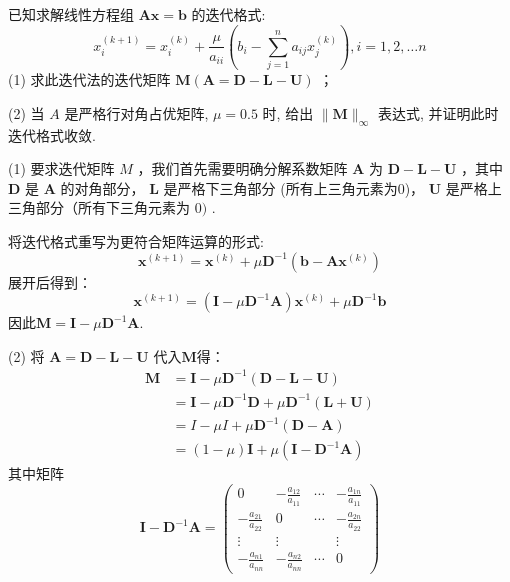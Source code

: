 \begin{tcolorbox}[breakable,
		colframe=white!10!jingga, coltitle=white!90!jingga, colback=white!95!jingga, coltext=black, colbacktitle=white!10!jingga, enhanced, fonttitle=\bfseries,fontupper=\normalsize, attach boxed title to top left={yshift=-2mm}, before skip=8pt, after skip=8pt,
		title=解答题]
 

    已知求解线性方程组 $ \boldsymbol{A x}=\boldsymbol{b} $ 的迭代格式:
$$
x_{i}^{(k+1)}=x_{i}^{(k)}+\frac{\mu}{a_{i i}}\left(b_{i}-\sum_{j=1}^{n} a_{i j} x_{j}^{(k)}\right), i=1,2, \ldots n
$$
(1) 求此迭代法的迭代矩阵 $ \boldsymbol{M}(\boldsymbol{A}=\boldsymbol{D}-\boldsymbol{L}-\boldsymbol{U}) $ ；

(2) 当 $ A $ 是严格行对角占优矩阵, $ {\mu}={0 . 5} $ 时, 给出 $ \|\boldsymbol{M}\|_{\infty} $ 表达式, 并证明此时迭代格式收敛.

\tcblower

(1) 要求迭代矩阵 $ M $ ，我们首先需要明确分解系数矩阵 $ \boldsymbol{A} $ 为 $ \boldsymbol{D}-\boldsymbol{L}-\boldsymbol{U} $ ，其中 $ \boldsymbol{D} $ 是 $ \boldsymbol{A} $ 的对角部分， $ \boldsymbol{L} $ 是严格下三角部分 (所有上三角元素为0)， $ \boldsymbol{U} $ 是严格上三角部分（所有下三角元素为 $ 0) $ .

将迭代格式重写为更符合矩阵运算的形式:
$$
\boldsymbol{x}^{(k+1)}=\boldsymbol{x}^{(k)}+\mu \boldsymbol{D}^{-1}\left(\boldsymbol{b}-\boldsymbol{A} \boldsymbol{x}^{(k)}\right)
$$
展开后得到：
$$
\boldsymbol{x}^{(k+1)}=(\boldsymbol{I}-\mu \boldsymbol{D}^{-1}\boldsymbol{A})\boldsymbol{x}^{(k)}+\mu \boldsymbol{D}^{-1}\boldsymbol{b}
$$
因此$\boldsymbol{M}=\boldsymbol{I}-\mu \boldsymbol{D}^{-1}\boldsymbol{A}$.


(2) 将 $ \boldsymbol{A}=\boldsymbol{D}-\boldsymbol{L}-\boldsymbol{U} $ 代入$\boldsymbol{M}$得：
$$
\begin{aligned}
\boldsymbol{M}&=\boldsymbol{I}-\mu \boldsymbol{D}^{-1}(\boldsymbol{D}-\boldsymbol{L}-\boldsymbol{U}) \\
&=\boldsymbol{I}-\mu \boldsymbol{D}^{-1} \boldsymbol{D}+\mu \boldsymbol{D}^{-1}(\boldsymbol{L}+\boldsymbol{U})\\
&=I-\mu I+\mu \boldsymbol{D}^{-1}(\boldsymbol{D}-\boldsymbol{A}) \\
&=(1-\mu) \boldsymbol{I}+\mu( \boldsymbol{I}-\boldsymbol{D}^{-1}\boldsymbol{A}) 
\end{aligned}
$$
其中矩阵
$$
\boldsymbol{I}-\boldsymbol{D}^{-1} \boldsymbol{A}=\left(\begin{array}{cccc}
0 & -\frac{a_{12}}{a_{11}} & \cdots & -\frac{a_{1 n}}{a_{11}} \\
-\frac{a_{21}}{a_{22}} & 0 & \cdots & -\frac{a_{2 n}}{a_{22}} \\
\vdots & \vdots & & \vdots \\
-\frac{a_{n 1}}{a_{n n}} & -\frac{a_{n 2}}{a_{n n}} & \cdots & 0
\end{array}\right)
$$


\end{tcolorbox}
